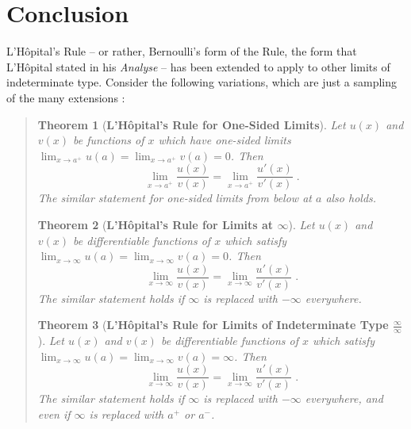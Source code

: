\message{ !name(LHopitalsRule_2021.03.29.tex)}\documentclass[11pt]{article}
\newtheorem*{thm*}{Theorem}
\begin{document}
\section{Conclusion}

L'H\^opital's Rule -- or rather, Bernoulli's form of the Rule, the form that L'H\^opital stated in his \emph{Analyse} -- has been extended to apply to other limits of indeterminate type. Consider the following variations, which are just a sampling of the many extensions \citep[p.~198]{Spivak}:
\begin{quote}
\begin{thm*}[{\bf L'H\^opital's Rule for One-Sided Limits}]
Let $u(x)$ and $v(x)$ be functions of $x$ which have one-sided limits ${\displaystyle \lim_{x\to a^+}u(a)=\lim_{x\to a^+} v(a)=0}$. Then
	\begin{equation*}
	\lim_{x\to a^+} \frac{u(x)}{v(x)}=\lim_{x\to a^+} \frac{u'(x)}{v'(x)}\;.
	\end{equation*}
The similar statement for one-sided limits from below at $a$ also holds.
\end{thm*}

\bigskip
\begin{thm*}[{\bf L'H\^opital's Rule for Limits at $\infty$}] %
Let $u(x)$ and $v(x)$ be differentiable functions of $x$ which satisfy ${\displaystyle \lim_{x\to \infty} u(a)=\lim_{x\to \infty} v(a)=0}$. Then
	\begin{equation*}
	\lim_{x\to \infty} \frac{u(x)}{v(x)}=\lim_{x\to \infty} \frac{u'(x)}{v'(x)}\;.
	\end{equation*}The similar statement holds if $\infty$ is replaced with $-\infty$ everywhere.
\end{thm*}

\bigskip
\begin{thm*}[{\bf L'H\^opital's Rule for Limits of Indeterminate Type $\frac{\infty}{\infty}$}]
Let $u(x)$ and $v(x)$ be differentiable functions of $x$ which satisfy ${\displaystyle \lim_{x\to \infty} u(a)=\lim_{x\to \infty} v(a)=\infty}$. Then
	\begin{equation*}
	\lim_{x\to \infty} \frac{u(x)}{v(x)}=\lim_{x\to \infty} \frac{u'(x)}{v'(x)}\;.
	\end{equation*}The similar statement holds if $\infty$ is replaced with $-\infty$ everywhere, and even if $\infty$ is replaced with $a^+$ or $a^-$.
\end{thm*}
\end{quote}
\end{document}
